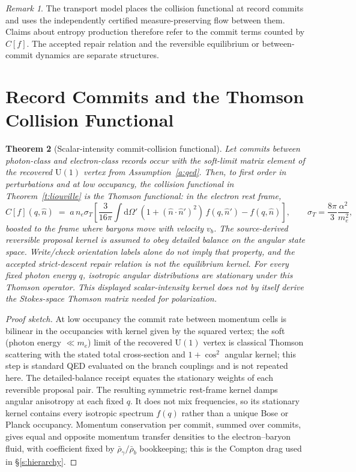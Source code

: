 \documentclass[11pt]{article}
\newtheorem{theorem}{Theorem}[section]
\theoremstyle{remark}
\newtheorem{remark}[theorem]{Remark}
\newcommand{\Dd}{\mathrm{d}}
\begin{document}
\begin{remark}
The transport model places the collision functional at record commits and
uses the independently certified measure-preserving flow between them. Claims
about entropy production therefore refer to the commit terms counted by
$C[f]$. The accepted repair relation and the reversible equilibrium or
between-commit dynamics are separate structures.
\end{remark}

\section{Record Commits and the Thomson Collision Functional}

\begin{theorem}[Scalar-intensity commit-collision functional]\label{t:collision}
Let commits between photon-class and electron-class records occur with the
soft-limit matrix element of the recovered $\mathrm U(1)$ vertex from
Assumption~\ref{a:qed}.
Then, to first order in perturbations and at low occupancy, the collision
functional in Theorem~\ref{t:liouville} is the Thomson functional: in the
electron rest frame,
\[
C[f](q,\hat n)\;=\;a\,n_e\sigma_T\left[
\frac{3}{16\pi}\int \Dd\Omega'\,(1+(\hat n\cdot\hat n')^2)\,f(q,\hat n')
- f(q,\hat n)\right],
\qquad
\sigma_T=\frac{8\pi}{3}\frac{\alpha^2}{m_e^2},
\]
boosted to the frame where baryons move with velocity $v_b$. The
source-derived reversible proposal kernel is assumed to obey detailed balance
on the angular state space. Write/check orientation labels alone do not imply
that property, and the accepted strict-descent repair relation is not the
equilibrium kernel. For every fixed photon energy $q$, isotropic angular
distributions are stationary under this Thomson operator. This displayed
scalar-intensity kernel does not by itself derive the Stokes-space Thomson
matrix needed for polarization.
\end{theorem}

\begin{proof}[Proof sketch]
At low occupancy the commit rate between momentum cells is bilinear in the
occupancies with kernel given by the squared vertex; the soft
(photon energy $\ll m_e$) limit of the recovered $\mathrm U(1)$ vertex is
classical Thomson scattering with the stated total cross-section and
$1+\cos^2$ angular kernel; this step is standard QED evaluated on the branch
couplings and is not repeated here. The detailed-balance receipt equates the
stationary weights of each reversible proposal pair. The resulting symmetric
rest-frame kernel damps angular anisotropy at each fixed
$q$. It does not mix frequencies, so its stationary kernel contains every
isotropic spectrum $f(q)$ rather than a unique Bose or Planck occupancy.
Momentum conservation per commit, summed over
commits, gives equal and opposite momentum transfer densities to the
electron--baryon fluid, with coefficient fixed by
$\bar\rho_\gamma/\bar\rho_b$ bookkeeping; this is the Compton drag used in
\S\ref{s:hierarchy}.
\end{proof}
\end{document}
